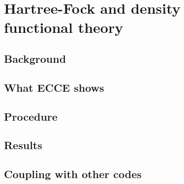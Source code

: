 \chapter{Hartree-Fock and density functional theory}
\label{ch:hf-dft}


\section{Background}

\section{What ECCE shows}

\section{Procedure}

\section{Results}

\section{Coupling with other codes}

